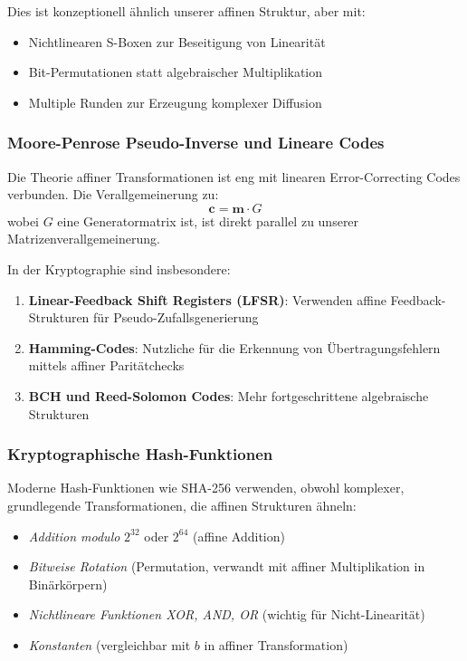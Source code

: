 ﻿\documentclass[12pt,a4paper]{article}
\begin{document}
	Dies ist konzeptionell ähnlich unserer affinen Struktur, aber mit:
	\begin{itemize}
		\item Nichtlinearen S-Boxen zur Beseitigung von Linearität
		\item Bit-Permutationen statt algebraischer Multiplikation
		\item Multiple Runden zur Erzeugung komplexer Diffusion
	\end{itemize}
	
	\subsubsection{Moore-Penrose Pseudo-Inverse und Lineare Codes}
	
	Die Theorie affiner Transformationen ist eng mit linearen Error-Correcting Codes verbunden. Die Verallgemeinerung zu:
	\begin{equation}
		\mathbf{c} = \mathbf{m} \cdot G
	\end{equation}
	wobei $G$ eine Generatormatrix ist, ist direkt parallel zu unserer Matrizenverallgemeinerung.
	
	In der Kryptographie sind insbesondere:
	\begin{enumerate}
		\item \textbf{Linear-Feedback Shift Registers (LFSR)}: Verwenden affine Feedback-Strukturen für Pseudo-Zufallsgenerierung
		\item \textbf{Hamming-Codes}: Nutzliche für die Erkennung von Übertragungsfehlern mittels affiner Paritätchecks
		\item \textbf{BCH und Reed-Solomon Codes}: Mehr fortgeschrittene algebraische Strukturen
	\end{enumerate}
	
	\subsubsection{Kryptographische Hash-Funktionen}
	
	Moderne Hash-Funktionen wie SHA-256 verwenden, obwohl komplexer, grundlegende Transformationen, die affinen Strukturen ähneln:
	\begin{itemize}
		\item \textit{Addition modulo } $2^{32}$ oder $2^{64}$ (affine Addition)
		\item \textit{Bitweise Rotation} (Permutation, verwandt mit affiner Multiplikation in Binärkörpern)
		\item \textit{Nichtlineare Funktionen XOR, AND, OR} (wichtig für Nicht-Linearität)
		\item \textit{Konstanten} (vergleichbar mit $b$ in affiner Transformation)
	\end{itemize}
	
\end{document}
